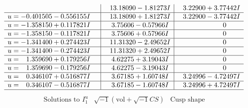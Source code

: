 \documentclass[1p]{elsarticle_modified}
\theoremstyle{definition}
\newcommand{\I}{\sqrt{-1}}
\begin{document}
$$\begin{array}{c|c|c}
 & \phantom{-}13.18090 - 1.81273 I & \phantom{-}3.22900 + 3.77442 I \\ \hline\begin{aligned}
u &= -0.401505 - 0.556155 I\end{aligned}
 & \phantom{-}13.18090 + 1.81273 I & \phantom{-}3.22900 - 3.77442 I \\ \hline\begin{aligned}
u &= -1.358150 + 0.117821 I\end{aligned}
 & \phantom{-}3.75606 - 0.57966 I & \phantom{-0.000000 } 0 \\ \hline\begin{aligned}
u &= -1.358150 - 0.117821 I\end{aligned}
 & \phantom{-}3.75606 + 0.57966 I & \phantom{-0.000000 } 0 \\ \hline\begin{aligned}
u &= -1.341400 + 0.274423 I\end{aligned}
 & \phantom{-}11.31320 - 2.49652 I & \phantom{-0.000000 } 0 \\ \hline\begin{aligned}
u &= -1.341400 - 0.274423 I\end{aligned}
 & \phantom{-}11.31320 + 2.49652 I & \phantom{-0.000000 } 0 \\ \hline\begin{aligned}
u &= \phantom{-}1.359690 + 0.179256 I\end{aligned}
 & \phantom{-}4.62275 + 3.19043 I & \phantom{-0.000000 } 0 \\ \hline\begin{aligned}
u &= \phantom{-}1.359690 - 0.179256 I\end{aligned}
 & \phantom{-}4.62275 - 3.19043 I & \phantom{-0.000000 } 0 \\ \hline\begin{aligned}
u &= \phantom{-}0.346107 + 0.516877 I\end{aligned}
 & \phantom{-}3.67185 + 1.60748 I & \phantom{-}3.24996 - 4.72497 I \\ \hline\begin{aligned}
u &= \phantom{-}0.346107 - 0.516877 I\end{aligned}
 & \phantom{-}3.67185 - 1.60748 I & \phantom{-}3.24996 + 4.72497 I\\
 \hline 
 \end{array}$$\newpage$$\begin{array}{c|c|c}  
\text{Solutions to }I^u_{1}& \I (\text{vol} + \sqrt{-1}CS) & \text{Cusp shape}\\

\end{array}$$
\end{document}
